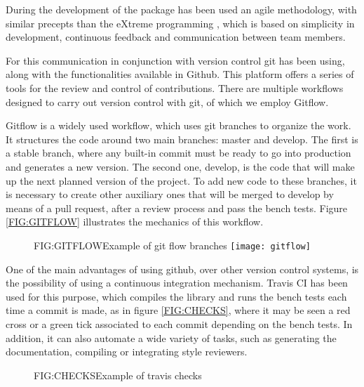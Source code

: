 During the development of the package has been used an agile methodology, with
similar precepts than the eXtreme programming \cite{eXtreme}, which is based on
simplicity in development, continuous feedback and communication between
team members.

For this communication in conjunction with version control git has been using,
along with the functionalities available in Github. This platform offers a
series of tools for the review and control of contributions. There are multiple
workflows designed to carry out version control with git, of which we employ
Gitflow.

Gitflow is a widely used workflow, which uses git branches to organize the work.
It structures the code around two main branches: master and develop. The first
is a stable branch, where any built-in commit must be ready to go into
production and generates a new version. The second one, develop, is the code
that will make up the next planned version of the project. To add new code to
these branches, it is necessary to create other auxiliary ones that will be
merged to develop by means of a pull request, after a review process and pass
the bench tests. Figure \ref{FIG:GITFLOW} illustrates the mechanics of this
workflow.


\begin{figure}[Example of git flow branches]{FIG:GITFLOW}{Example of git flow branches \footnotemark}
  \texttt{[image: gitflow]}
\end{figure}


One of the main advantages of using github, over other version control systems,
is the possibility of using a continuous integration mechanism. Travis CI has
been used for this purpose, which compiles the library and runs the bench tests
each time a commit is made, as in figure \ref{FIG:CHECKS}, where it may be seen a red cross
or a green tick associated to each commit depending on the bench tests. In
addition, it can also automate a wide variety of tasks, such as generating the
documentation, compiling or integrating style reviewers.

\begin{figure}[Example of travis checks]{FIG:CHECKS}{Example of travis checks}
\end{figure}
